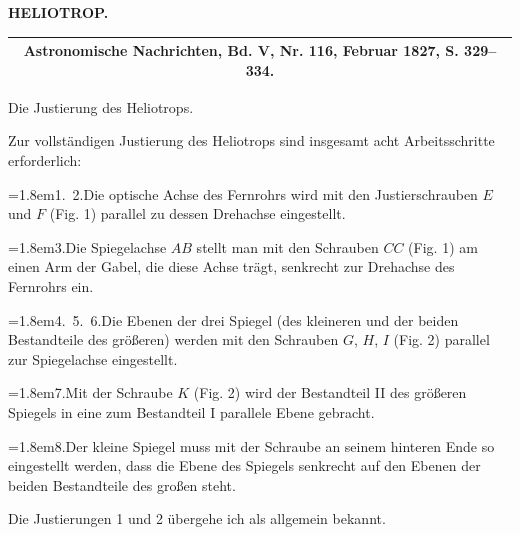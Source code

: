 \par\clearpage
\noindent{}\hfill{\small\textbf{HELIOTROP.}}\hfill\null\par
\vspace*{4.4cm}
\begin{center}
\begin{tabular}{c}\hline
\small\textbf{Astronomische Nachrichten, Bd. V, Nr. 116, Februar 1827, S. 329--334.}\\\hline
\end{tabular}\par\bigskip
{\large Die Justierung des Heliotrops.}
\end{center}
\par\noindent\hspace*{\parindent}Zur vollständigen Justierung des Heliotrops sind insgesamt acht Arbeitsschritte erforderlich:
\par\noindent\hangindent=1.8em\hspace*{1em}1.\ 2.\quad Die optische Achse des Fernrohrs wird mit den Justierschrauben $E$ und $F$ (Fig. 1) parallel zu dessen Drehachse eingestellt.
\par\noindent\hangindent=1.8em\hspace*{1em}3.\quad Die Spiegelachse $AB$ stellt man mit den Schrauben $CC$ (Fig. 1) am einen Arm der Gabel, die diese Achse trägt, senkrecht zur Drehachse des Fernrohrs ein.
\par\noindent\hangindent=1.8em\hspace*{1em}4.\ 5.\ 6.\quad Die Ebenen der drei Spiegel (des kleineren und der beiden Bestandteile des größeren) werden mit den Schrauben $G$, $H$, $I$ (Fig. 2) parallel zur Spiegelachse eingestellt.
\par\noindent\hangindent=1.8em\hspace*{1em}7.\quad Mit der Schraube $K$ (Fig. 2) wird der Bestandteil II des größeren Spiegels in eine zum Bestandteil I parallele Ebene gebracht.
\par\noindent\hangindent=1.8em\hspace*{1em}8.\quad Der kleine Spiegel muss mit der Schraube an seinem hinteren Ende so eingestellt werden, dass die Ebene des Spiegels senkrecht auf den Ebenen der beiden Bestandteile des großen steht.
\par\noindent\hspace*{\parindent}Die Justierungen 1 und 2 übergehe ich als allgemein bekannt.

